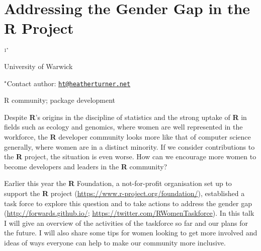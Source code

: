 \documentclass[\main/boa.tex]{subfiles}
\begin{document}
\section{Addressing the Gender Gap in the R Project}

\begin{center}
  {\bf {}$^{1^\star}$}
\end{center}

\vskip 0.3cm

\begin{affiliations}
\begin{enumerate}
\begin{minipage}{0.915\textwidth}
\centering
\item University of Warwick \\[-2pt]
\end{minipage}
\end{enumerate}
$^\star$Contact author: \href{mailto:ht@heatherturner.net}{\nolinkurl{ht@heatherturner.net}}\\
\end{affiliations}

\vskip 0.5cm

\begin{minipage}{0.915\textwidth}
\keywords R community; package development
\end{minipage}

\vskip 0.8cm

Despite \textbf{R}'s origins in the discipline of statistics and the
strong uptake of \textbf{R} in fields such as ecology and genomics,
where women are well represented in the workforce, the \textbf{R}
developer community looks more like that of computer science generally,
where women are in a distinct minority. If we consider contributions to
the \textbf{R} project, the situation is even worse. How can we
encourage more women to become developers and leaders in the \textbf{R}
community?

Earlier this year the \textbf{R} Foundation, a not-for-profit
organisation set up to support the \textbf{R} project
(\url{https://www.r-project.org/foundation/}), established a task force
to explore this question and to take actions to address the gender gap
(\url{http://forwards.github.io/};
\url{https://twitter.com/RWomenTaskforce}). In this talk I will give an
overview of the activities of the taskforce so far and our plans for the
future. I will also share some tips for women looking to get more
involved and ideas of ways everyone can help to make our community more
inclusive.
\end{document}
